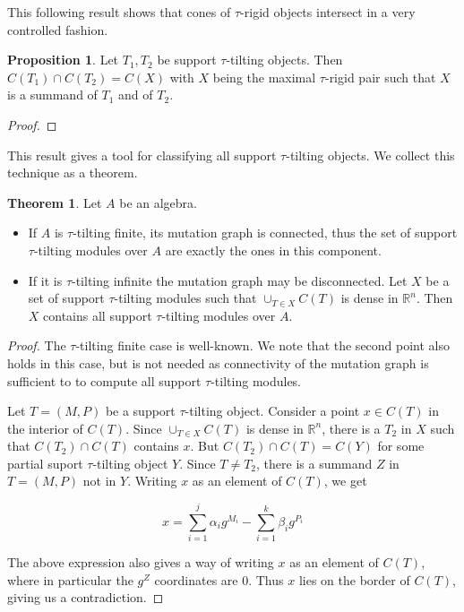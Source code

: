 \documentclass[]{article}
\theoremstyle{definition}
\newtheorem{theorem}{Theorem}[section]
\newtheorem{proposition}{Proposition}[section]
\newcommand{\tu}{\ensuremath{\tau}}
\begin{document}
This following result shows that cones of $\tau$-rigid objects intersect in a very controlled fashion.

\begin{proposition}\cite[Corollary 6.7, b)]{dij17}
	Let $T_1,T_2$ be support \tu-tilting objects. Then $C(T_1) \cap C(T_2) = C(X)$ with $X$ being the maximal \tu-rigid pair such that $X$ is a summand of $T_1$ and of $T_2$.
\end{proposition}

\begin{proof}
\end{proof}


This result gives a tool for classifying all support \tu-tilting objects. We collect this technique as a theorem.

\begin{theorem}\cite{dij17}
	Let $A$ be an algebra.
	
	\begin{itemize}
		\item If $A$ is \tu-tilting finite, its mutation graph is connected, thus the set of support \tu-tilting modules over $A$ are exactly the ones in this component.
		\item If it is \tu-tilting infinite the mutation graph may be disconnected. Let $X$ be a set of support \tu-tilting modules such that $\cup_{T \in X} C(T)$ is dense in $\mathbb{R}^n$. Then $X$ contains all support \tu-tilting modules over $A$.
		
	\end{itemize}
\end{theorem}

\begin{proof}
	The \tu-tilting finite case is well-known. We note that the second point also holds in this case, but is not needed as connectivity of the mutation graph is sufficient to to compute all support \tu-tilting modules.
	
	Let $T = (M,P)$ be a support \tu-tilting object. Consider a point $x \in C(T)$ in the interior of $C(T)$. Since $\cup_{T \in X} C(T)$ is dense in $\mathbb{R}^n$, there is a $T_2$ in $X$ such that $C(T_2) \cap C(T)$ contains $x$. But $C(T_2)\cap C(T) = C(Y)$ for some partial suport \tu-tilting object $Y$. Since $T \neq T_2$, there is a summand $Z$ in $T = (M,P)$ not in $Y$. Writing $x$ as an element of $C(T)$, we get
	
	\[x = \sum_{i = 1}^{j} \alpha_ig^{M_i} - \sum_{i = 1}^{k}\beta_ig^{P_i}\]

	The above expression also gives a way of writing $x$ as an element of  $C(T)$, where in particular the $g^{Z}$ coordinates are $0$. Thus $x$ lies on the border of $C(T)$, giving us a contradiction.
	
\end{proof}
\end{document}
